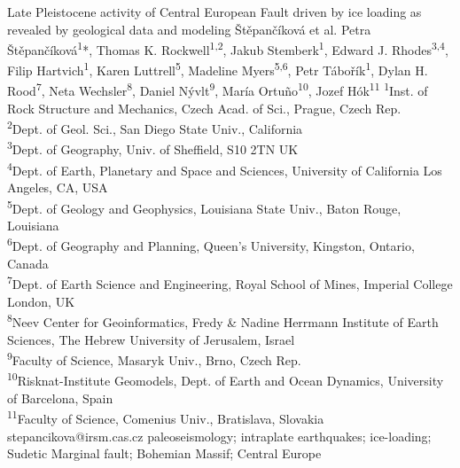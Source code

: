 \abstract
{Late Pleistocene activity of Central European Fault driven by ice loading as revealed by geological data and modeling} 
{Štěpančíková et al.} 
{Petra Štěpančíková\textsuperscript{1}*, Thomas K. Rockwell\textsuperscript{1,2}, Jakub Stemberk\textsuperscript{1}, Edward J. Rhodes\textsuperscript{3,4}, Filip Hartvich\textsuperscript{1}, Karen Luttrell\textsuperscript{5}, Madeline Myers\textsuperscript{5,6}, Petr Tábořík\textsuperscript{1}, Dylan H. Rood\textsuperscript{7}, Neta Wechsler\textsuperscript{8}, Daniel Nývlt\textsuperscript{9}, María Ortuño\textsuperscript{10}, Jozef Hók\textsuperscript{11}} 
{\TLtag} 
{
	\textsuperscript{1}Inst. of Rock Structure and Mechanics, Czech Acad. of Sci., Prague, Czech Rep.\\
	\textsuperscript{2}Dept. of Geol. Sci., San Diego State Univ., California\\
	\textsuperscript{3}Dept. of Geography, Univ. of Sheffield, S10 2TN UK\\
	\textsuperscript{4}Dept. of Earth, Planetary and Space and Sciences, University of California Los Angeles, CA, USA\\
	\textsuperscript{5}Dept. of Geology and Geophysics, Louisiana State Univ., Baton Rouge, Louisiana\\
	\textsuperscript{6}Dept. of Geography and Planning, Queen’s University, Kingston, Ontario, Canada\\
	\textsuperscript{7}Dept. of Earth Science and Engineering, Royal School of Mines, Imperial College London, UK\\
	\textsuperscript{8}Neev Center for Geoinformatics, Fredy \& Nadine Herrmann Institute of Earth Sciences, The Hebrew University of Jerusalem, Israel\\
	\textsuperscript{9}Faculty of Science, Masaryk Univ., Brno, Czech Rep.\\
	\textsuperscript{10}Risknat-Institute Geomodels, Dept. of Earth and Ocean Dynamics, University of Barcelona, Spain\\
	\textsuperscript{11}Faculty of Science, Comenius Univ., Bratislava, Slovakia  
}
{stepancikova@irsm.cas.cz}  %
{paleoseismology; intraplate earthquakes; ice-loading; Sudetic Marginal fault; Bohemian Massif; Central Europe}
